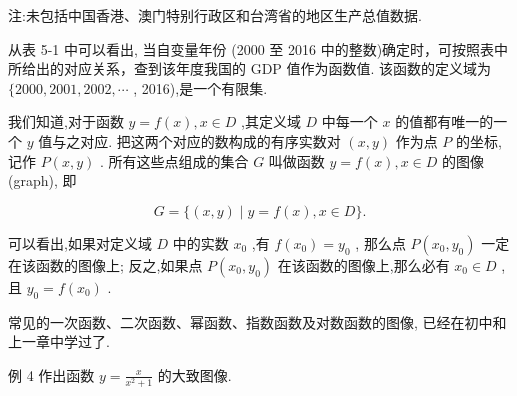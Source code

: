 \documentclass[10pt]{article}
\begin{document}
\begin{center}
\end{center}

注:未包括中国香港、澳门特别行政区和台湾省的地区生产总值数据.





从表 5-1 中可以看出, 当自变量年份 (2000 至 2016 中的整数)确定时，可按照表中所给出的对应关系，查到该年度我国的 GDP 值作为函数值. 该函数的定义域为 \(\{ {2000},{2001},{2002},\cdots\) , 2016),是一个有限集.

我们知道,对于函数 \(y = f\left( x\right) ,x \in  D\) ,其定义域 \(D\) 中每一个 \(x\) 的值都有唯一的一个 \(y\) 值与之对应. 把这两个对应的数构成的有序实数对 \(\left( {x,y}\right)\) 作为点 \(P\) 的坐标,记作 \(P\left( {x,y}\right)\) . 所有这些点组成的集合 \(G\) 叫做函数 \(y = f\left( x\right) ,x \in  D\) 的图像 (graph), 即

\[
G = \{ \left( {x,y}\right)  \mid  y = f\left( x\right) ,x \in  D\} .
\]

可以看出,如果对定义域 \(D\) 中的实数 \({x}_{0}\) ,有 \(f\left( {x}_{0}\right)  = {y}_{0}\) , 那么点 \(P\left( {{x}_{0},{y}_{0}}\right)\) 一定在该函数的图像上; 反之,如果点 \(P\left( {{x}_{0},{y}_{0}}\right)\) 在该函数的图像上,那么必有 \({x}_{0} \in  D\) ,且 \({y}_{0} = f\left( {x}_{0}\right)\) .

常见的一次函数、二次函数、幂函数、指数函数及对数函数的图像, 已经在初中和上一章中学过了.

例 4 作出函数 \(y = \frac{x}{{x}^{2} + 1}\) 的大致图像.
\end{document}
